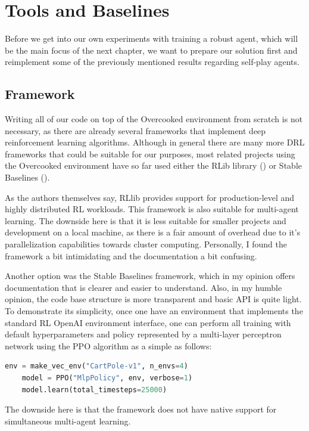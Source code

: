 \chapter{Tools and Baselines}\label{BackgroundChapter}
Before we get into our own experiments with training a robust agent, which will be the main focus of the next chapter, we want to prepare our solution first and reimplement some of the previously mentioned results regarding self-play agents.

\section{Framework}
Writing all of our code on top of the Overcooked environment from scratch is not necessary, as there are already several frameworks that implement deep reinforcement learning algorithms.
Although in general there are many more DRL frameworks that could be suitable for our purposes, most related projects using the Overcooked environment have so far used either the RLib library (\cite{liang2018rllib}) or Stable Baselines (\cite{stable-baselines}).

As the authors themselves say, RLlib provides support for production-level and highly distributed RL workloads.
This framework is also suitable for multi-agent learning.
The downside here is that it is less suitable for smaller projects and development on a local machine, as there is a fair amount of overhead due to it's parallelization capabilities towards cluster computing.
Personally, I found the framework a bit intimidating and the documentation a bit confusing.

Another option was the Stable Baselines framework, which in my opinion offers documentation that is clearer and easier to understand.
Also, in my humble opinion, the code base structure is more transparent and basic API is quite light.
To demonstrate its simplicity, once one have an environment that implements the standard RL OpenAI environment interface, one can perform all training with default hyperparameters and policy represented by a multi-layer perceptron network using the PPO algorithm as a simple as follows:
\begin{lstlisting}[language=Python]
    env = make_vec_env("CartPole-v1", n_envs=4)
    model = PPO("MlpPolicy", env, verbose=1)
    model.learn(total_timesteps=25000)

\end{lstlisting}
The downside here is that the framework does not have native support for simultaneous multi-agent learning.


